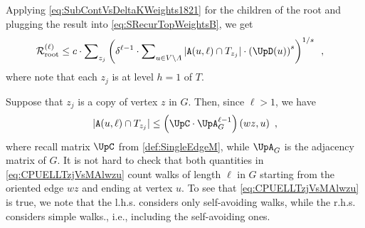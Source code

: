 \documentclass[11pt,reqno]{amsart}
\numberwithin{equation}{section}
\newcommand{\applegreen}[1]{ {\color{applegreen}#1}}
\newcommand{\blue}[1]{{\color{blue}#1}}
\newcommand{\cadmiumgreen}[1]{{\color{cadmiumgreen}#1}}
\newcommand{\cadmiumorange}[1]{{\color{cadmiumorange}#1}}
\newcommand{\coquelicot}[1]{{\color{coquelicot}#1}}
\newcommand{\darkmagenta}[1]{{\color{darkmagenta}#1}}
\newcommand{\red}[1]{{\color{red}#1}}
\newcommand{\pfs}{\darkmagenta{s}}
\newcommand{\cp}{{\tt A}}
\newcommand{\abs}[1]{\blue{|}#1\blue{|}}
\newcommand{\Adjacency}{{\UpA}}
\newcommand{\EdgeToV}{\UpC}
\renewcommand{\applegreen}[1]{#1}
\renewcommand{\blue}[1]{#1}
\renewcommand{\cadmiumgreen}[1]{#1}
\renewcommand{\cadmiumorange}[1]{#1}
\renewcommand{\coquelicot}[1]{#1}
\renewcommand{\darkmagenta}[1]{#1}
\renewcommand{\red}[1]{#1}
\newcommand{\kh}{\cadmiumorange{h}}
\newcommand{\kj}{\coquelicot{j}}
\newcommand{\kell}{{\color{green(pigment)}\ell}}%
\newcommand{\ku}{\red{u}}
\newcommand{\kw}{\blue{w}}
\newcommand{\kz}{\cadmiumgreen{z}}
\renewcommand{\kh}{h}
\renewcommand{\kj}{j}
\renewcommand{\kell}{\ell}
\renewcommand{\ku}{u}
\renewcommand{\kw}{w}
\renewcommand{\kz}{z}
\begin{document}
Applying \eqref{eq:SubContVsDeltaKWeights1821} for the children of the root and plugging the result into \eqref{eq:SRecurTopWeightsB}, we get
\begin{align}\label{eq:FinalBoundRroorAdj}
 \subcont_{\rm root} & \leq %
 c\cdot \sum\nolimits_{\kz_{\kj}} \left( \delta^{\kell-1} \cdot \sum\nolimits_{\ku\in V\setminus \Lambda} \abs{\cp(\ku,\kell)\cap T_{\kz_{\kj} }} \cdot 
\left ( \UpD(\ku)\right )^{\pfs} \right )^{1/{\pfs}} \enspace,
\end{align}
where note that each $\kz_{\kj}$ is at level $\kh=1$ of $T$.



Suppose that $\kz_{\kj}$ is a copy of vertex $\kz$ in $G$. Then, since $\kell>1$,  we have 
\begin{align}\label{eq:CPUELLTzjVsMAlwzu}
\abs{\cp(\ku,\kell)\cap T_{\kz_j}}   \leq \left( \EdgeToV\cdot \Adjacency^{\kell-1}_G\right)(\kw\kz,\ku)\enspace, 
\end{align}
where recall matrix $\EdgeToV$ from \eqref{def:SingleEdgeM}, while $\Adjacency_G$ is the 
adjacency matrix of $G$. 
%
It is not hard to check that  both quantities in \eqref{eq:CPUELLTzjVsMAlwzu} count walks of length $\kell$ in $G$ starting
from the oriented edge $\kw\kz$ and ending at vertex $\ku$. To see that \eqref{eq:CPUELLTzjVsMAlwzu} is true, 
we note that the l.h.s. considers only self-avoiding walks, while the
 r.h.s. considers simple walks., i.e., including the self-avoiding ones. 
\end{document}
